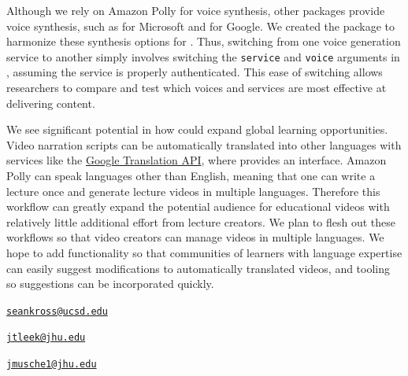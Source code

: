 Although we rely on Amazon Polly for voice synthesis, other packages
provide voice synthesis, such as  for Microsoft and
 for Google. We created the 
package to harmonize these synthesis options for . Thus,
switching from one voice generation service to another simply involves
switching the \texttt{service} and \texttt{voice} arguments in
, assuming the service is properly authenticated. This ease of
switching allows researchers to compare and test which voices and
services are most effective at delivering content.

We see significant potential in how  could expand global
learning opportunities. Video narration scripts can be automatically
translated into other languages with services like the
\href{https://cloud.google.com/translate/docs/}{Google Translation API},
where  provides an interface. Amazon Polly can
speak languages other than English, meaning that one can write a lecture
once and generate lecture videos in multiple languages. Therefore this
workflow can greatly expand the potential audience for educational
videos with relatively little additional effort from lecture creators.
We plan to flesh out these workflows so that video creators can manage
videos in multiple languages. We hope to add functionality so that
communities of learners with language expertise can easily suggest
modifications to automatically translated videos, and tooling so
suggestions can be incorporated quickly.




\address{%
Sean Kross\\
Department of Cognitive Science, University of California, San Diego\\
9500 Gilman Dr.\\ La Jolla, CA 92093\\
}
\href{mailto:seankross@ucsd.edu}{\nolinkurl{seankross@ucsd.edu}}

\address{%
Jeffrey T. Leek\\
Department of Biostatistics, Johns Hopkins Bloomberg School of Public
Health\\
615 N Wolfe Street\\ Baltimore, MD 21231\\
}
\href{mailto:jtleek@jhu.edu}{\nolinkurl{jtleek@jhu.edu}}

\address{%
John Muschelli\\
Department of Biostatistics, Johns Hopkins Bloomberg School of Public
Health\\
615 N Wolfe Street\\ Baltimore, MD 21231\\
}
\href{mailto:jmusche1@jhu.edu}{\nolinkurl{jmusche1@jhu.edu}}
